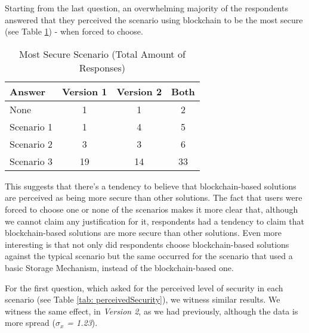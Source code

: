 Starting from the last question, an overwhelming majority of the respondents answered that they perceived the scenario using blockchain to be the most secure (see Table \ref{tab: mostSecure}) - when forced to choose.

\begin{table}[htb]
	\centering
	\caption{Most Secure Scenario (Total Amount of Responses)}
	\label{tab: mostSecure}
	\begin{tabular}{l|ccc}
		\hline \bf Answer & \bf Version 1 & \bf Version 2 & \bf Both \\ \hline
		None              & 1             & 1             & 2        \\
		Scenario 1        & 1             & 4             & 5        \\
		Scenario 2        & 3             & 3             & 6        \\
		Scenario 3        & 19            & 14            & 33       \\
		\hline
	\end{tabular}
\end{table}

This suggests that there's a tendency to believe that blockchain-based solutions are perceived as being more secure than other solutions. The fact that users were forced to choose one or none of the scenarios makes it more clear that, although we cannot claim any justification for it, respondents had a tendency to claim that blockchain-based solutions are more secure than other solutions. Even more interesting is that not only did respondents choose blockchain-based solutions against the typical scenario but the same occurred for the scenario that used a basic Storage Mechanism, instead of the blockchain-based one.

For the first question, which asked for the perceived level of security in each scenario (see Table \ref{tab: perceivedSecurity}), we witness similar results. We witness the same effect, in \textit{Version 2}, as we had previously, although the data is more spread (\textit{$\sigma_{x}$ = 1.23}).

